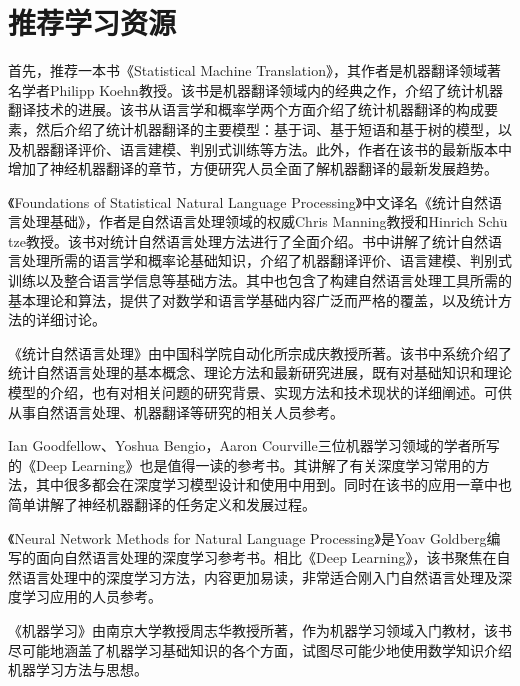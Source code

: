 
\sectionnewpage
\section{推荐学习资源}

\parinterval 首先，推荐一本书《Statistical Machine Translation》\cite{koehn2009statistical}，其作者是机器翻译领域著名学者Philipp Koehn教授。该书是机器翻译领域内的经典之作，介绍了统计机器翻译技术的进展。该书从语言学和概率学两个方面介绍了统计机器翻译的构成要素，然后介绍了统计机器翻译的主要模型：基于词、基于短语和基于树的模型，以及机器翻译评价、语言建模、判别式训练等方法。此外，作者在该书的最新版本中增加了神经机器翻译的章节，方便研究人员全面了解机器翻译的最新发展趋势\cite{DBLP:journals/corr/abs-1709-07809}。

\parinterval 《Foundations of Statistical Natural Language Processing》\cite{manning1999foundations}中文译名《统计自然语言处理基础》，作者是自然语言处理领域的权威Chris Manning教授和Hinrich Sch$\ddot{\textrm{u}}$tze教授。该书对统计自然语言处理方法进行了全面介绍。书中讲解了统计自然语言处理所需的语言学和概率论基础知识，介绍了机器翻译评价、语言建模、判别式训练以及整合语言学信息等基础方法。其中也包含了构建自然语言处理工具所需的基本理论和算法，提供了对数学和语言学基础内容广泛而严格的覆盖，以及统计方法的详细讨论。

\parinterval 《统计自然语言处理》\cite{宗成庆2013统计自然语言处理}由中国科学院自动化所宗成庆教授所著。该书中系统介绍了统计自然语言处理的基本概念、理论方法和最新研究进展，既有对基础知识和理论模型的介绍，也有对相关问题的研究背景、实现方法和技术现状的详细阐述。可供从事自然语言处理、机器翻译等研究的相关人员参考。

\parinterval  Ian Goodfellow、Yoshua Bengio，Aaron Courville三位机器学习领域的学者所写的《Deep Learning》\cite{Goodfellow-et-al-2016}也是值得一读的参考书。其讲解了有关深度学习常用的方法，其中很多都会在深度学习模型设计和使用中用到。同时在该书的应用一章中也简单讲解了神经机器翻译的任务定义和发展过程。

\parinterval 《Neural Network Methods for Natural Language Processing》\cite{goldberg2017neural}是Yoav Goldberg编写的面向自然语言处理的深度学习参考书。相比《Deep Learning》，该书聚焦在自然语言处理中的深度学习方法，内容更加易读，非常适合刚入门自然语言处理及深度学习应用的人员参考。

\parinterval 《机器学习》\cite{周志华2016机器学习}由南京大学教授周志华教授所著，作为机器学习领域入门教材，该书尽可能地涵盖了机器学习基础知识的各个方面，试图尽可能少地使用数学知识介绍机器学习方法与思想。

